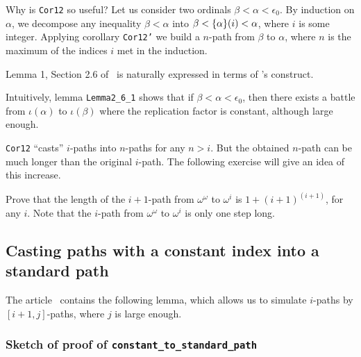 Why is \texttt{Cor12} so useful? 
Let us  consider two ordinals  $\beta<\alpha<\epsilon_0$. By induction on $\alpha$,
we decompose any inequality $\beta<\alpha$ into $\beta < \mbox{$\{\alpha\}(i)$}< \alpha$, where $i$ is some integer. Applying corollary \texttt{Cor12'} we build a $n$-path from $\beta$ to $\alpha$,
where $n$ is the maximum of the indices $i$ met in the induction.

 Lemma 1, Section 2.6 of~\cite{KS81} is naturally expressed in terms of \coq's
\verb@sig@ construct.

\label{lemma:L-2_6-1}




Intuitively, lemma   \texttt{Lemma2\_6\_1}  shows that if $\beta<\alpha<\epsilon_0$, then there exists  a battle from $\iota(\alpha)$ to $\iota(\beta)$ where the replication factor is constant, although large enough. 



\begin{remark}
 \texttt{Cor12} ``casts'' $i$-paths into $n$-paths for any $n>i$.
But the obtained $n$-path can be much longer than the original $i$-path.
The following exercise will give an idea of this increase. 
\end{remark}

\begin{exercise}
  Prove that  the length of the $i+1$-path from
  $\omega^\omega$ to $\omega^i$ is $1 + (i+1)^{(i+1)}$, for any $i$. Note that the $i$-path from
  $\omega^\omega$ to $\omega^i$ is only one step long.
 \end{exercise}




\subsection{Casting paths with a constant index into a standard path}


The article~\cite{KS81} contains 
the following lemma, which allows us to simulate $i$-paths by $[i+1,j]$-paths, where $j$ is large enough.



\subsubsection{Sketch of proof of \texttt{constant\_to\_standard\_path}}

